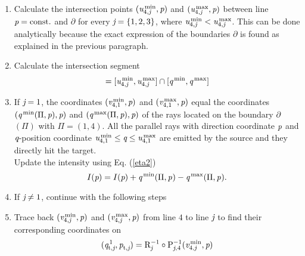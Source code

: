 \begin{enumerate}
\item Calculate the intersection points $(\textit{u}_{4,\textit{j}}^\textrm{\,min}, \textit{p})$ and $(\textit{u}_{4,\textit{j}}^\textrm{\,max}, \textit{p})$ between line $\textit{p}= \textrm{const.}$ and $\partial$ for every $\textit{j}=\{1,2,3\}$, where $\textit{u}_{4,\textit{j}}^\textrm{\,min}<\textit{u}_{4,\textit{j}}^\textrm{\,max}$. This can be done analytically because the exact expression of the boundaries $\partial$ is found as explained in the previous paragraph.
\item Calculate the intersection segment 
\begin{equation*}
[\variabile{v}_{4, \lineai}^\textrm{\,min}, \variabile{v}_{4, \lineai}^\textrm{\,max}] = [\variabile{u}_{4, \lineai}^\textrm{\,min}, \variabile{u}_{4, \lineai}^\textrm{\,max}]\cap
 [\pos{}{}^\textrm{\,min}, \pos{}{}^\textrm{\,max}]
\end{equation*}
\item If $\textit{j}= 1$, the coordinates $(\textit{v}_{4,1}^\textrm{\,min}, \textit{p})$ and $(\textit{v}_{4,1}^\textrm{\,max}, \textit{p})$ equal the coordinates $(\textit{q}^\textrm{\,min}(\Pi, \textit{p}), \textit{p})$ and $(\textit{q}^\textrm{\,max}(\Pi, \textit{p}), \textit{p})$ of the rays located on the boundary $\partial$$(\Pi)$ with $\Pi = (1,4)$. All the parallel rays with direction coordinate $\textit{p}$ and $\textit{q}$-position coordinate $\textit{u}_{4,1}^\textrm{\,min}\leq \textit{q} \leq \textit{u}_{4,1}^\textrm{\,max}$ are emitted by the source and they directly hit the target. \\
\indent Update the intensity using Eq. (\ref{eta2})
\begin{equation*}
I(\textit{p})= I(\textit{p})+\textit{q}^\textrm{\,min}(\Pi, \textit{p}_{\textrm{} \textit{}})-\textit{q}^\textrm{\,max}(\Pi, \textit{p}_{\textrm{} \textit{}}).
\end{equation*}
\item If $\textit{j}\neq 1$, continue with the following steps
\item Trace back $(\textit{v}_{4,\textit{j}}^\textrm{\,min}, \textit{p})$ and $(\textit{v}_{4,\textit{j}}^\textrm{\,max}, \textit{p})$ from line $4$ to line $\textit{j}$ to find their corresponding coordinates on 
\begin{equation*}
\begin{aligned}
(\pos{t,}{\lineai}^{\,1}, \dir{t,}{\lineai})& =\inversemap{R}{\lineai}{}\circ \inversemap{P}{\lineai,}{4}(\variabile{v}_{4,\lineai}^\textrm{\,min}, \variabile{p})  \\

\end{aligned}
\end{equation*}
\end{enumerate}
